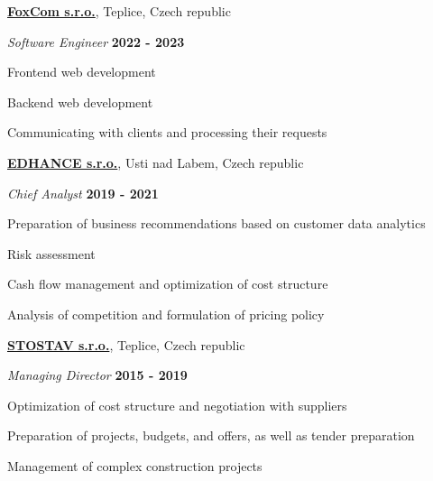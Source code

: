 \documentclass[10pt]{article}
\newenvironment{outerlist}[0]%
        {\begin{itemize}}
	{\end{itemize}
         \vspace{-.6\baselineskip}}
\newenvironment{innerlist}[0]%
        {\begin{compactitem}}
	{\end{compactitem}}
\newcommand{\blankline}{\quad\pagebreak[2]}
\begin{document}
\href{http://www.foxcom.eu}{\textbf{FoxCom s.r.o.}}, 
Teplice, Czech republic

\begin{outerlist}
	\item[] \textit{Software Engineer}%
		\hfill \textbf{2022 - 2023}
	\begin{innerlist}
		\item Frontend web development
		\item Backend web development
		\item Communicating with clients and processing their requests	
		
	\end{innerlist}
\end{outerlist}
\blankline


\href{http://www.edhance.cz}{\textbf{EDHANCE s.r.o.}}, 
Usti nad Labem, Czech republic

\begin{outerlist}
	\item[] \textit{Chief Analyst}%
		\hfill \textbf{2019 - 2021}
	\begin{innerlist}
		\item Preparation of business recommendations based on customer data analytics
		\item Risk assessment
		\item Cash flow management and optimization of cost structure
		\item Analysis of competition and formulation of pricing policy
		
	\end{innerlist}
\end{outerlist}
\blankline

\href{http://www.stostav.cz}{\textbf{STOSTAV s.r.o.}}, 
Teplice, Czech republic

\begin{outerlist}
	\item[] \textit{Managing Director}%
		\hfill \textbf{2015 - 2019}
	\begin{innerlist}
		\item Optimization of cost structure and negotiation with suppliers
		\item Preparation of projects, budgets, and offers, as well as tender preparation
		\item Management of complex construction projects
	\end{innerlist}
\end{outerlist}
\blankline
\end{document}
